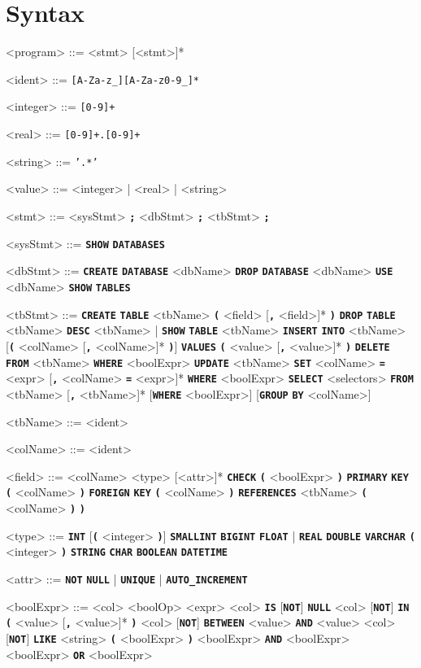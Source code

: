 \documentclass{article}
\renewcommand{\t}[1]{\texttt{\textbf{#1}}}
\begin{document}
\section{Syntax}
\setlength{\grammarindent}{10em}
\begin{grammar}

<program> ::= <stmt> [<stmt>]*

<ident> ::= \texttt{[A-Za-z_][A-Za-z0-9_]*}

<integer> ::= \texttt{[0-9]+}

<real> ::= \texttt{[0-9]+.[0-9]+}

<string> ::= \texttt{'.*'}

<value> ::= <integer> | <real> | <string>

<stmt> ::= <sysStmt> \t{;}
\alt <dbStmt> \t{;}
\alt <tbStmt> \t{;}

<sysStmt> ::= \t{SHOW} \t{DATABASES}

<dbStmt> ::= \t{CREATE} \t{DATABASE} <dbName>
\alt \t{DROP} \t{DATABASE} <dbName>
\alt \t{USE} <dbName>
\alt \t{SHOW} \t{TABLES}

<tbStmt> ::= \t{CREATE} \t{TABLE} <tbName> \t{(} <field> [\t{,} <field>]* \t{)}
\alt \t{DROP} \t{TABLE} <tbName>
\alt \t{DESC} <tbName> | \t{SHOW} \t{TABLE} <tbName>
\alt \t{INSERT} \t{INTO} <tbName> [\t{(} <colName> [\t{,} <colName>]* \t{)}] \t{VALUES} \t{(} <value> [\t{,} <value>]* \t{)}
\alt \t{DELETE} \t{FROM} <tbName> \t{WHERE} <boolExpr>
\alt \t{UPDATE} <tbName> \t{SET} <colName> \t{=} <expr> [\t{,} <colName> \t{=} <expr>]* \t{WHERE} <boolExpr>
\alt \t{SELECT} <selectors> \t{FROM} <tbName> [\t{,} <tbName>]* [\t{WHERE} <boolExpr>] [\t{GROUP} \t{BY} <colName>]

<tbName> ::= <ident>

<colName> ::= <ident>

<field> ::= <colName> <type> [<attr>]*
\alt \t{CHECK} \t{(} <boolExpr> \t{)}
\alt \t{PRIMARY} \t{KEY} \t{(} <colName> \t{)}
\alt \t{FOREIGN} \t{KEY} \t{(} <colName> \t{)} \t{REFERENCES} <tbName> \t{(} <colName> \t{)} \t{)}

<type> ::= \t{INT} [\t{(} <integer> \t{)}]
\alt \t{SMALLINT}
\alt \t{BIGINT}
\alt \t{FLOAT} | \t{REAL}
\alt \t{DOUBLE}
\alt \t{VARCHAR} \t{(} <integer> \t{)}
\alt \t{STRING}
\alt \t{CHAR}
\alt \t{BOOLEAN}
\alt \t{DATETIME}

<attr> ::= \t{NOT} \t{NULL} | \t{UNIQUE} | \t{AUTO_INCREMENT}

<boolExpr> ::= <col> <boolOp> <expr>
\alt <col> \t{IS} [\t{NOT}] \t{NULL}
\alt <col> [\t{NOT}] \t{IN} \t{(} <value> [\t{,} <value>]* \t{)}
\alt <col> [\t{NOT}] \t{BETWEEN} <value> \t{AND} <value>
\alt <col> [\t{NOT}] \t{LIKE} <string>
\alt \t{(} <boolExpr> \t{)}
\alt <boolExpr> \t{AND} <boolExpr>
\alt <boolExpr> \t{OR} <boolExpr>


\end{grammar}
\end{document}
